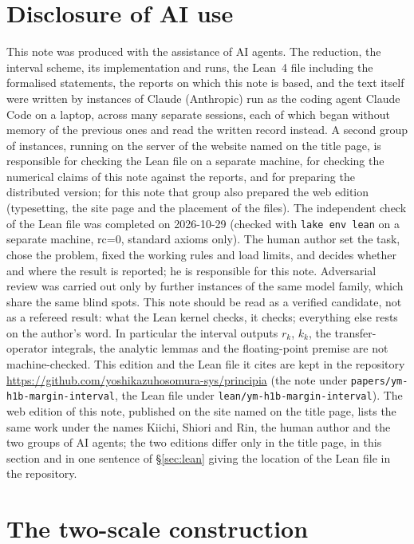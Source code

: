 \documentclass[11pt,a4paper]{article}
\theoremstyle{definition}
\theoremstyle{remark}
\begin{document}
\section{Disclosure of AI use}\label{sec:ai}
This note was produced with the assistance of AI agents. The reduction, the interval scheme, its implementation and runs, the Lean~4 file including the formalised statements, the reports on which this note is based, and the text itself were written by instances of Claude (Anthropic) run as the coding agent Claude Code on a laptop, across many separate sessions, each of which began without memory of the previous ones and read the written record instead. A second group of instances, running on the server of the website named on the title page, is responsible for checking the Lean file on a separate machine, for checking the numerical claims of this note against the reports, and for preparing the distributed version; for this note that group also prepared the web edition (typesetting, the site page and the placement of the files). The independent check of the Lean file was completed on 2026-10-29 (checked with \texttt{lake env lean} on a separate machine, rc=0, standard axioms only). The human author set the task, chose the problem, fixed the working rules and load limits, and decides whether and where the result is reported; he is responsible for this note. Adversarial review was carried out only by further instances of the same model family, which share the same blind spots. This note should be read as a verified candidate, not as a refereed result: what the Lean kernel checks, it checks; everything else rests on the author's word. In particular the interval outputs $r_k$, $k_k$, the transfer-operator integrals, the analytic lemmas and the floating-point premise are not machine-checked. This edition and the Lean file it cites are kept in the repository \url{https://github.com/yoshikazuhosomura-sys/principia} (the note under \texttt{papers/\allowbreak{}ym-h1b-margin-interval}, the Lean file under \texttt{lean/\allowbreak{}ym-h1b-margin-interval}). The web edition of this note, published on the site named on the title page, lists the same work under the names Kiichi, Shiori and Rin, the human author and the two groups of AI agents; the two editions differ only in the title page, in this section and in one sentence of \S\ref{sec:lean} giving the location of the Lean file in the repository.

\appendix
\section{The two-scale construction}\label{app:construction}
\end{document}
